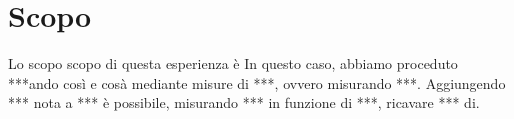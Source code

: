 \section*{Scopo}

Lo scopo scopo di questa esperienza è %
In questo caso, abbiamo proceduto ***ando così e cosà mediante misure di ***, ovvero misurando ***.
Aggiungendo *** nota a *** è possibile, misurando *** in funzione di ***, ricavare *** di.
